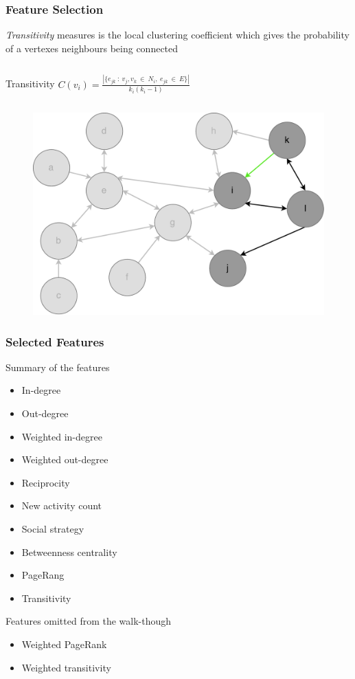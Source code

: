 \begin{frame}
\frametitle{Feature Selection}
\textit{Transitivity} measures is the local clustering coefficient which gives the probability of a vertexes neighbours being connected
\begin{columns}\centering
\begin{column}{0.8\textwidth}
	\begin{block}{\small Transitivity}\centering
		$C(v_i) = \frac{|\{e_{jk}\ :\  v_j,v_k\ \in\ N_i,\ e_{jk}\ \in\ E\}|}{k_i(k_i -1)}$
	\end{block}
\end{column}
\end{columns}
\begin{figure}
	\includegraphics[scale=0.32]{graphics/directed_network_example_transitivity.pdf}
\end{figure}

\end{frame}


\begin{frame}
\frametitle{Selected Features}
Summary of the features
\begin{itemize}
\item In-degree
\item Out-degree
\item Weighted in-degree
\item Weighted out-degree
\item Reciprocity 
\item New activity count
\item Social strategy
\item Betweenness centrality
\item PageRang
\item Transitivity
\end{itemize}

Features omitted from the walk-though 
\begin{itemize}
\item Weighted PageRank
\item Weighted transitivity
\end{itemize}
\end{frame}

